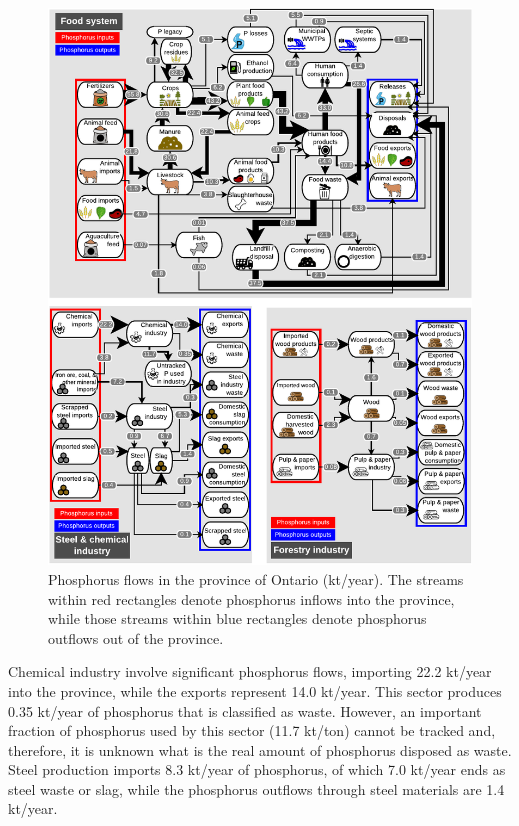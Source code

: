 \documentclass[]{elsarticle}
\begin{document}
\begin{figure}[H]
	\centering
	\includegraphics[width=0.95\linewidth, trim={0cm 0cm 0cm 0cm},clip]{Figures/Diagram2-4.pdf} 
	\caption{Phosphorus flows in the province of Ontario (kt/year). The streams within red rectangles denote phosphorus inflows into the province, while those streams within blue rectangles denote phosphorus outflows out of the province.}
	\label{fig:FigFlowsSummary}
\end{figure}

Chemical industry involve significant phosphorus flows, importing 22.2 kt/year into the province, while the exports represent 14.0 kt/year. This sector produces 0.35 kt/year of phosphorus that is classified as waste. However, an important fraction of phosphorus used by this sector (11.7 kt/ton) cannot be tracked and, therefore, it is unknown what is the real amount of phosphorus disposed as waste.  Steel production imports 8.3 kt/year of phosphorus, of which 7.0 kt/year ends as steel waste or slag, while the phosphorus outflows through steel materials are 1.4 kt/year.
\end{document}
